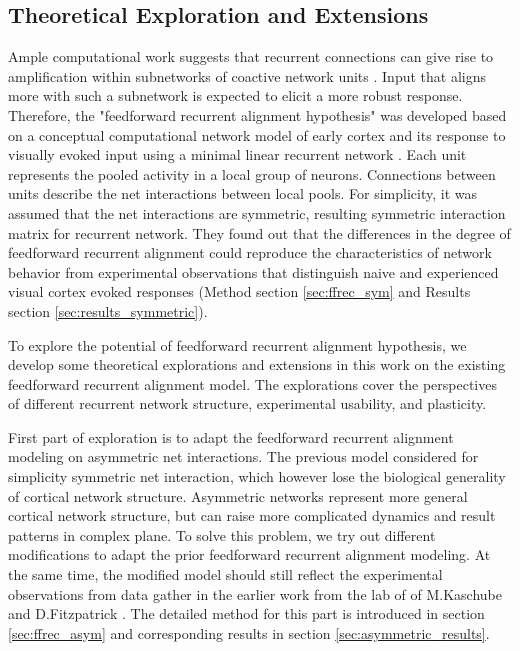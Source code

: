 \documentclass[11pt]{article}
\begin{document}
	\subsection{Theoretical Exploration and Extensions}
	Ample computational work suggests that recurrent connections can give rise to amplification within subnetworks of coactive network units \cite{abbott1994decoding, ben1995theory, douglas1995recurrent, miller2016canonical, christie2017cortical, peron2020recurrent}. Input that aligns more with such a subnetwork is expected to elicit a more robust response. 
	Therefore, the "feedforward recurrent alignment hypothesis" was developed based on a conceptual computational network model of early cortex and its response to visually evoked input using a minimal linear recurrent network \cite{tragenap2023nature}. Each unit represents the pooled activity in a local group of neurons. Connections between units describe the net interactions between local pools. For simplicity, it was assumed that the net interactions are symmetric, resulting symmetric interaction matrix for recurrent network. They found out that the differences in the degree of feedforward recurrent alignment could reproduce the characteristics of network behavior from experimental observations that distinguish naive and experienced visual cortex evoked responses (Method section \ref{sec:ffrec_sym} and Results section \ref{sec:results_symmetric}). 
	
	To explore the potential of feedforward recurrent alignment hypothesis, we develop some theoretical explorations and extensions in this work on the existing feedforward recurrent alignment model. The explorations cover the perspectives of different recurrent network structure, experimental usability, and plasticity. 
	
	First part of exploration is to adapt the feedforward recurrent alignment modeling on asymmetric net interactions. The previous model considered for simplicity symmetric net interaction, which however lose the biological generality of cortical network structure. Asymmetric networks represent more general cortical network structure, but can raise more complicated dynamics and result patterns in complex plane. To solve this problem, we try out different modifications to adapt the prior feedforward recurrent alignment modeling. At the same time, the modified model should still reflect the experimental observations from data gather in the earlier work from the lab of of M.Kaschube and D.Fitzpatrick \cite{tragenap2023nature}. The detailed method for this part is introduced in section \ref{sec:ffrec_asym} and corresponding results in section \ref{sec:asymmetric_results}. 
	
\end{document}
